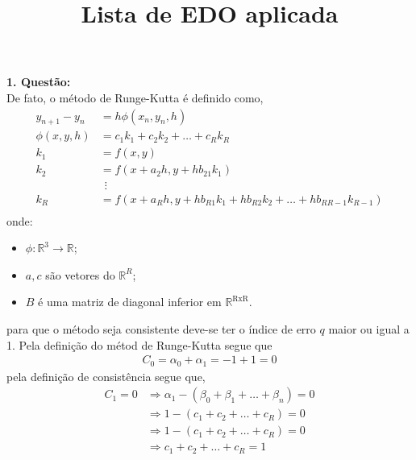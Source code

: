 \documentclass[a4paper,12pt]{article}
\title{Lista de EDO aplicada}
\date{\vspace{-5ex}}
\begin{document}
\maketitle\thispagestyle{fancy}
\textbf{1. Quest\~ao:}\\

De fato, o m\'etodo de Runge-Kutta \'e definido como,\\
\begin{align*}
	y_{n+1} - y_{n} &= h\phi(x_{n},y_{n},h)\\
	\phi(x,y,h) &= {c_1}{k_1} + {c_2}{k_2} + \dots + {c_R}{k_R}\\
	k_1 &= f(x,y)\\ 
	k_2 &= f(x + a_2 h,y + hb_{21}{k_1})\\ 
	& \hspace{5pt}\vdots  \\
	k_R &= f(x + a_R h,y + hb_{R1}{k_1} + hb_{R2}{k_2} + \dots + hb_{RR-1}{k_{R-1}})\\ 
\end{align*}
onde:\\
\begin{itemize}
	\item $\phi :\mathbb{R}^{3} \rightarrow \mathbb{R}$;
	\item $a,c$ s\~ao vetores do $\mathbb{R}^{R}$; 
	\item $B$ \'e uma matriz de diagonal inferior em $\mathbb{R}^{\mathrm{RxR}}$.
\end{itemize}
para que o m\'etodo seja consistente deve-se ter o \'indice de erro $q$ maior ou igual a 1. Pela defini\c c\~ao do
m\'etod de Runge-Kutta segue que
\begin{align*}
	C_0 = {\alpha}_0 + {\alpha}_1 = -1 + 1 = 0
\end{align*}
pela defini\c c\~ao de consist\^encia segue que,
\begin{align*}
	C_1 = 0 &\Rightarrow {\alpha}_{1} - ({\beta}_{0} + {\beta}_{1} + \dots + {\beta}_{n} ) = 0 \\
	&\Rightarrow 1 -(c_1 + c_2 + \dots + c_R) = 0  \\
	&\Rightarrow 1 -(c_1 + c_2 + \dots + c_R) = 0  \\
	&\Rightarrow c_1 + c_2 + \dots + c_R = 1 
\end{align*}
\end{document}
